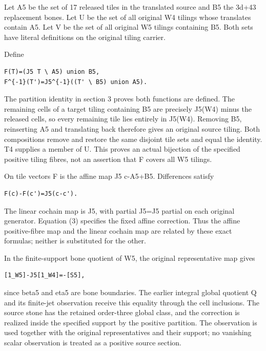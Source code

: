 \documentclass[
  10pt,
]{scrreprt}
\begin{document}
Let A5 be the set of 17 released tiles in the translated source and B5
the 3d+43 replacement bones. Let U be the set of all original W4 tilings
whose translates contain A5. Let V be the set of all original W5 tilings
containing B5. Both sets have literal definitions on the original tiling
carrier.

Define

\begin{verbatim}
F(T)=(J5 T \ A5) union B5,
F^{-1}(T')=J5^{-1}((T' \ B5) union A5).
\end{verbatim}

The partition identity in section 3 proves both functions are defined.
The remaining cells of a target tiling containing B5 are precisely
J5(W4) minus the released cells, so every remaining tile lies entirely
in J5(W4). Removing B5, reinserting A5 and translating back therefore
gives an original source tiling. Both compositions remove and restore
the same disjoint tile sets and equal the identity. T4 supplies a member
of U. This proves an actual bijection of the specified positive tiling
fibres, not an assertion that F covers all W5 tilings.

On tile vectors F is the affine map J5 c-A5+B5. Differences satisfy

\begin{verbatim}
F(c)-F(c')=J5(c-c').
\end{verbatim}

The linear cochain map is J5, with partial J5=J5 partial on each
original generator. Equation (3) specifies the fixed affine correction.
Thus the affine positive-fibre map and the linear cochain map are
related by these exact formulas; neither is substituted for the other.

In the finite-support bone quotient of W5, the original representative
map gives

\begin{verbatim}
[1_W5]-J5[1_W4]=-[S5],
\end{verbatim}

since beta5 and eta5 are bone boundaries. The earlier integral global
quotient Q and its finite-jet observation receive this equality through
the cell inclusions. The source stone has the retained order-three
global class, and the correction is realized inside the specified
support by the positive partition. The observation is used together with
the original representatives and their support; no vanishing scalar
observation is treated as a positive source section.
\end{document}
